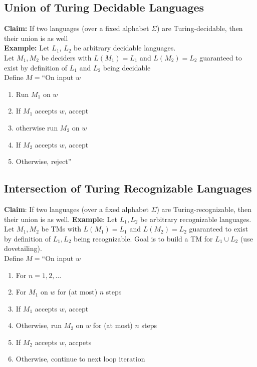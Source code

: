 \documentclass{article}
\begin{document}
\subsection{Union of Turing Decidable Languages}
\textbf{Claim:} If two languages (over a fixed alphabet $\Sigma$) are Turing-decidable, then their union is as well\\
\textbf{Example:} Let $L_1$, $L_2$ be arbitrary decidable languages.\\
Let $M_1,M_2$ be deciders with $L(M_1)=L_1$ and $L(M_2)=L_2$ guaranteed to exist by definition of $L_1$ and $L_2$ being decidable\\
Define $M=$``On input $w$
\begin{enumerate}
    \item Run $M_1$ on $w$
    \item If $M_1$ accepts $w$, accept
    \item otherwise run $M_2$ on $w$
    \item If $M_2$ accepts $w$, accept
    \item Otherwise, reject''
\end{enumerate}
\newpage
\subsection{Intersection of Turing Recognizable Languages}
{\bf Claim}: If two languages  (over a fixed alphabet  $\Sigma$) are Turing-recognizable, then  their union  is  as well.
{\bf Example}: Let $L_1,L_2$ be arbitrary recognizable languages. Let $M_1,M_2$ be TMs with $L(M_1)=L_1$ and $L(M_2)=L_2$ guaranteed to exist by definition of $L_1,L_2$ being recognizable. Goal is to build a TM for $L_1\cup L_2$ (use dovetailing).\\
Define $M=$``On input $w$
\begin{enumerate}
    \item For $n=1,2,\dots$
    \item \hspace*{0.25in} For $M_1$ on $w$ for (at most) $n$ steps
    \item \hspace*{0.25in} If $M_1$ accepts $w$, accept
    \item \hspace*{0.25in} Otherwise, run $M_2$ on $w$ for (at most) $n$ steps
    \item \hspace*{0.25in} If $M_2$ accepts $w$, accpets
    \item \hspace*{0.25in} Otherwise, continue to next loop iteration
\end{enumerate}
\end{document}
